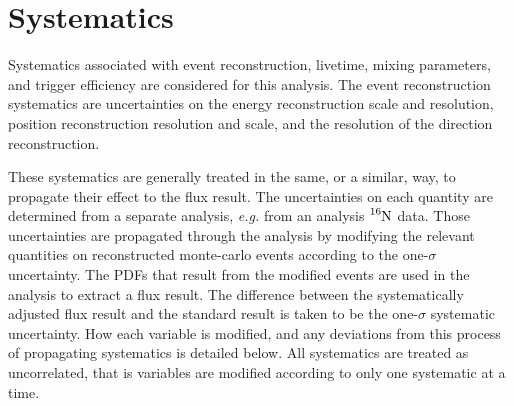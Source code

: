 \section{Systematics}
Systematics associated with event reconstruction, livetime, mixing parameters,
and trigger efficiency are considered for this analysis.
The event reconstruction systematics are uncertainties on the energy reconstruction
scale and resolution, position reconstruction resolution and scale, and the
resolution of the direction reconstruction.

These systematics are generally treated in the same, or a similar, way, to propagate
their effect to the flux result.
The uncertainties on each quantity are determined from a separate analysis, \textit{e.g.}
from an analysis $\ce{^{16}N}$ data.
Those uncertainties are propagated through the analysis by modifying the
relevant quantities on reconstructed monte-carlo events according to the
one-$\sigma$ uncertainty.
The PDFs that result from the modified events are used in the analysis to extract
a flux result.
The difference between the systematically adjusted flux result and the standard
result is taken to be the one-$\sigma$ systematic uncertainty.
How each variable is modified, and any deviations from this process of
propagating systematics is detailed below.
All systematics are treated as uncorrelated, that is variables are modified according to
only one systematic at a time.

